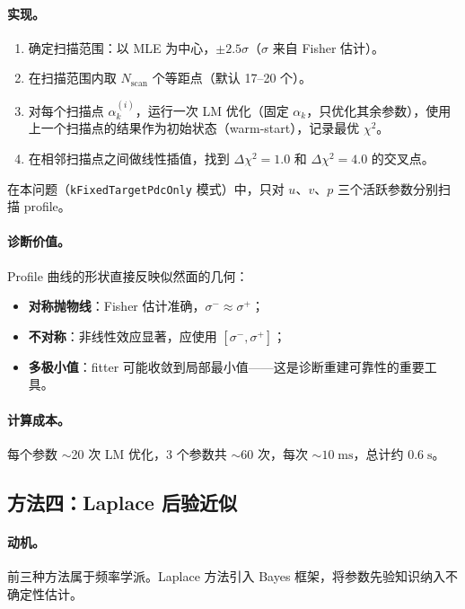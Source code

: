 \documentclass[a4paper, 11pt]{article}
\begin{document}
\paragraph{实现。}
\begin{enumerate}[nosep]
  \item 确定扫描范围：以 MLE 为中心，$\pm 2.5\sigma$（$\sigma$ 来自 Fisher 估计）。
  \item 在扫描范围内取 $N_\mathrm{scan}$ 个等距点（默认 17--20 个）。
  \item 对每个扫描点 $\alpha_k^{(i)}$，运行一次 LM 优化（固定 $\alpha_k$，只优化其余参数），使用上一个扫描点的结果作为初始状态（warm-start），记录最优 $\chi^2$。
  \item 在相邻扫描点之间做线性插值，找到 $\Delta\chi^2 = 1.0$ 和 $\Delta\chi^2 = 4.0$ 的交叉点。
\end{enumerate}

在本问题（\texttt{kFixedTargetPdcOnly} 模式）中，只对 $u$、$v$、$p$ 三个活跃参数分别扫描 profile。

\paragraph{诊断价值。}
Profile 曲线的形状直接反映似然面的几何：
\begin{itemize}[nosep]
  \item \textbf{对称抛物线}：Fisher 估计准确，$\sigma^- \approx \sigma^+$；
  \item \textbf{不对称}：非线性效应显著，应使用 $[\sigma^-, \sigma^+]$；
  \item \textbf{多极小值}：fitter 可能收敛到局部最小值——这是诊断重建可靠性的重要工具。
\end{itemize}

\paragraph{计算成本。} 每个参数 $\sim$20 次 LM 优化，3 个参数共 $\sim 60$ 次，每次 $\sim 10\;\mathrm{ms}$，总计约 $0.6\;\mathrm{s}$。

\subsection{方法四：Laplace 后验近似}
\label{sec:laplace}

\paragraph{动机。}
前三种方法属于频率学派。Laplace 方法引入 Bayes 框架，将参数先验知识纳入不确定性估计。
\end{document}
